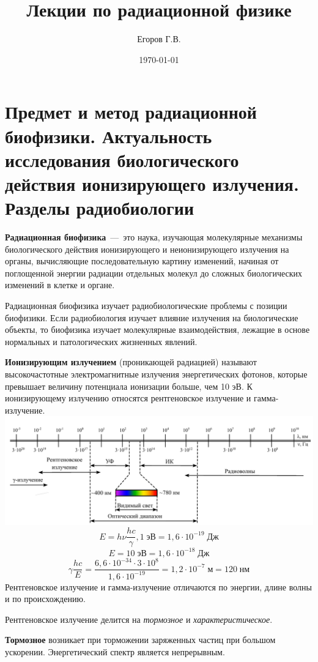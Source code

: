 \documentclass[a4paper, 14pt]{article}
\title{Лекции по радиационной физике}
\author{Егоров Г.В.}
\date{\selectlanguage{russian}\today}
\begin{document}
\maketitle
\section{Предмет и метод радиационной биофизики. Актуальность исследования
биологического действия ионизирующего излучения. Разделы радиобиологии}
\textbf{Радиационная биофизика}~---~это наука, изучающая молекулярные механизмы
биологического действия ионизирующего и неионизирующего излучения на органы,
вычисляющие последовательную картину изменений, начиная от поглощенной
энергии радиации отдельных молекул до сложных биологических изменений в клетке
и органе.

Радиационная биофизика изучает радиобиологические проблемы с позиции
биофизики. Если радиобиология изучает влияние излучения на биологические
объекты, то биофизика изучает молекулярные взаимодействия, лежащие в основе
нормальных и патологических жизненных явлений.

\textbf{Ионизирующим излучением} (проникающей радиацией) называют
высокочастотные электромагнитные излучения энергетических фотонов, которые
превышает величину потенциала ионизации больше, чем 10 эВ. К ионизирующему
излучению относятся рентгеновское излучение и гамма-излучение.
\includegraphics[width=\textwidth]{EMW}
\[ E = h\nu \frac{hc}{\gamma}, 1\;\text{эВ} = 1,6 \cdot 10^{-19}\;\text{Дж}\]
\[ E = 10\;\text{эВ} = 1,6 \cdot 10^{-18}\;\text{Дж}\]
\[ \gamma \frac{hc}{E} = \frac{6,6\cdot 10^{-34} \cdot 3 \cdot 10^8}{1,6 \cdot 10^{-19}} = 1,2 \cdot 10^{-7}\;\text{м} = 120\;\text{нм}\]
Рентгеновское излучение и гамма-излучение отличаются по энергии, длине
волны и по происхождению.

Рентгеновское излучение делится на \textit{тормозное} и \textit{характеристическое}.

\textbf{Тормозное} возникает при торможении заряженных частиц при большом
ускорении. Энергетический спектр является непрерывным.
\end{document}
